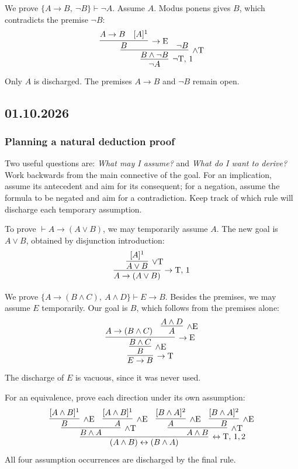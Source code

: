 \documentclass[11pt,a4paper]{amsart}
\begin{document}
\begin{example}
  We prove \(\{A\to B,\ \neg B\}\vdash\neg A\). Assume \(A\).
  Modus ponens gives \(B\), which contradicts the premise \(\neg B\):
  \[
    \infer[\neg\mathrm T,\,1]{\neg A}{
      \infer[\land\mathrm T]{B\land\neg B}{
        \infer[\to\mathrm E]{B}{A\to B & [A]^1}
    & \neg B}}
  \]
  Only \(A\) is discharged. The premises \(A\to B\) and \(\neg B\)
  remain open.
\end{example}

\subsection{01.10.2026}

\subsubsection{Planning a natural deduction proof}

Two useful questions are: \emph{What may I assume?} and \emph{What do I
want to derive?} Work backwards from the main connective of the goal.
For an implication, assume its antecedent and aim for its consequent;
for a negation, assume the formula to be negated and aim for a contradiction.
Keep track of which rule will discharge each temporary assumption.

\begin{example}
  To prove \(\vdash A\to(A\lor B)\), we may temporarily assume \(A\).
  The new goal is \(A\lor B\), obtained by disjunction introduction:
  \[
    \infer[\to\mathrm T,\,1]{A\to(A\lor B)}{
    \infer[\lor\mathrm T]{A\lor B}{[A]^1}}
  \]
\end{example}

\begin{example}
  We prove \(\{A\to(B\land C),\ A\land D\}\vdash E\to B\).
  Besides the premises, we may assume \(E\) temporarily. Our goal is
  \(B\), which follows from the premises alone:
  \[
    \infer[\to\mathrm T]{E\to B}{
      \infer[\land\mathrm E]{B}{
        \infer[\to\mathrm E]{B\land C}{
    A\to(B\land C) & \infer[\land\mathrm E]{A}{A\land D}}}}
  \]
  The discharge of \(E\) is vacuous, since it was never used.
\end{example}

\begin{example}
  For an equivalence, prove each direction under its own assumption:
  \[
    \infer[\leftrightarrow\mathrm T,\,1,2]
    {(A\land B)\leftrightarrow(B\land A)}{
      \infer[\land\mathrm T]{B\land A}{
        \infer[\land\mathrm E]{B}{[A\land B]^1}
      & \infer[\land\mathrm E]{A}{[A\land B]^1}}
      & \infer[\land\mathrm T]{A\land B}{
        \infer[\land\mathrm E]{A}{[B\land A]^2}
    & \infer[\land\mathrm E]{B}{[B\land A]^2}}}
  \]
  All four assumption occurrences are discharged by the final rule.
\end{example}
\end{document}
